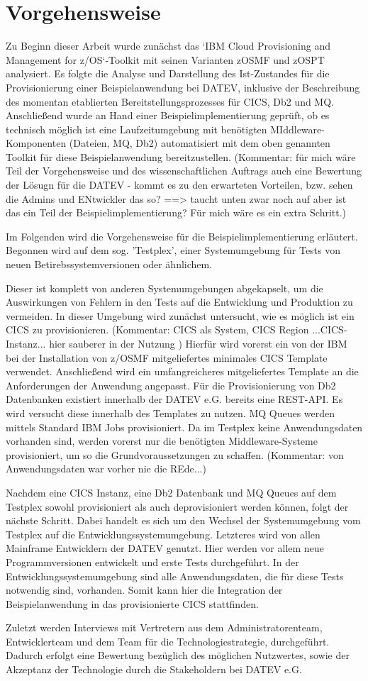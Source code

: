 \chapter{Vorgehensweise}\label{ch:vorgehensweise}
Zu Beginn dieser Arbeit wurde zunächst das `IBM Cloud Provisioning and Management for z/OS`-Toolkit mit seinen Varianten zOSMF und zOSPT analysiert.
Es folgte die Analyse und Darstellung des Ist-Zustandes für die  Provisionierung einer Beispielanwendung bei DATEV, inklusive der Beschreibung des momentan etablierten Bereitstellungsprozesses für CICS, Db2 und MQ.
Anschließend wurde an Hand einer Beispielimplementierung geprüft, ob es technisch möglich ist eine Laufzeitumgebung mit benötigten MIddleware-Komponenten (Dateien, MQ, Db2) automatisiert mit dem oben genannten Toolkit für diese Beispielanwendung bereitzustellen.
(Kommentar: für mich wäre Teil der Vorgehensweise und des wissenschaftlichen Auftrags auch eine Bewertung der Lösugn für die DATEV - kommt es zu den erwarteten Vorteilen, bzw. sehen die Admins und ENtwickler das so? ==> taucht unten zwar noch auf aber ist das ein Teil der Beispielimplementierung? Für mich wäre es ein extra Schritt.)

Im Folgenden wird die Vorgehensweise für die Beispielimplementierung erläutert. 
Begonnen wird auf dem sog. 'Testplex', einer Systemumgebung für Tests von neuen Betirebssystemversionen oder ähnlichem.

Dieser ist komplett von anderen Systemumgebungen abgekapselt, um die Auswirkungen von Fehlern in den Tests auf die Entwicklung und Produktion zu vermeiden.
In dieser Umgebung wird zunächst untersucht, wie es möglich ist ein CICS zu provisionieren. (Kommentar: CICS als System, CICS Region ...CICS-Instanz... hier sauberer in der Nutzung ) 
Hierfür wird vorerst ein von der IBM bei der Installation von z/OSMF mitgeliefertes minimales CICS Template verwendet.
Anschließend wird ein umfangreicheres mitgeliefertes Template an die Anforderungen der Anwendung angepasst.
Für die Provisionierung von Db2 Datenbanken existiert innerhalb der DATEV e.G. bereits eine REST-API.
Es wird versucht diese innerhalb des Templates zu nutzen.
MQ Queues werden mittels Standard IBM Jobs provisioniert.
Da im Testplex keine Anwendungsdaten vorhanden sind, werden vorerst nur die benötigten Middleware-Systeme provisioniert, um so die Grundvoraussetzungen zu schaffen. (Kommentar: von Anwendungsdaten war vorher nie die REde...)

Nachdem eine CICS Instanz, eine Db2 Datenbank und MQ Queues auf dem Testplex sowohl provisioniert als auch deprovisioniert werden können, folgt der nächste Schritt.
Dabei handelt es sich um den Wechsel der Systemumgebung vom Testplex auf die Entwicklungssystemumgebung.
Letzteres wird von allen Mainframe Entwicklern der DATEV genutzt.
Hier werden vor allem neue Programmversionen entwickelt und erste Tests durchgeführt.
In der Entwicklungssystemumgebung sind alle Anwendungsdaten, die für diese Tests notwendig sind, vorhanden.
Somit kann hier die Integration der Beispielanwendung in das provisionierte CICS stattfinden.

Zuletzt werden Interviews mit Vertretern aus dem Administratorenteam, Entwicklerteam und dem Team für die Technologiestrategie, durchgeführt.
Dadurch erfolgt eine Bewertung bezüglich des möglichen Nutzwertes, sowie der Akzeptanz der Technologie durch die Stakeholdern bei DATEV e.G.
